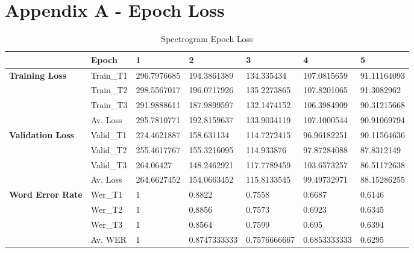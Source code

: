
\chapter{Appendix A - Epoch Loss} %

\label{AppendixA} %

\begin{table}[!ht]
    \centering
    \caption{Spectrogram Epoch Loss}
    \begin{adjustbox}{width=\textwidth,keepaspectratio}
    \begin{tabular}{|l|l|l|l|l|l|l|}
    \hline
        \textbf{} & \textbf{Epoch} & \textbf{1} & \textbf{2} & \textbf{3} & \textbf{4} & \textbf{5} \\ \hline
        \textbf{Training Loss} & Train\_T1 & 296.7976685 & 194.3861389 & 134.335434 & 107.0815659 & 91.11164093 \\ \hline
        \textbf{} & Train\_T2 & 298.5567017 & 196.0717926 & 135.2273865 & 107.8201065 & 91.3082962 \\ \hline
        \textbf{} & Train\_T3 & 291.9888611 & 187.9899597 & 132.1474152 & 106.3984909 & 90.31215668 \\ \hline
        \textbf{} & Av. Loss & 295.7810771 & 192.8159637 & 133.9034119 & 107.1000544 & 90.91069794 \\ \hline
        \textbf{Validation Loss} & Valid\_T1 & 274.4621887 & 158.631134 & 114.7272415 & 96.96182251 & 90.11564636 \\ \hline
        \textbf{} & Valid\_T2 & 255.4617767 & 155.3216095 & 114.933876 & 97.87284088 & 87.8312149 \\ \hline
        \textbf{} & Valid\_T3 & 264.06427 & 148.2462921 & 117.7789459 & 103.6573257 & 86.51172638 \\ \hline
        \textbf{} & Av. Loss & 264.6627452 & 154.0663452 & 115.8133545 & 99.49732971 & 88.15286255 \\ \hline
        \textbf{Word Error Rate} & Wer\_T1 & 1 & 0.8822 & 0.7558 & 0.6687 & 0.6146 \\ \hline
        \textbf{} & Wer\_T2 & 1 & 0.8856 & 0.7573 & 0.6923 & 0.6345 \\ \hline
        \textbf{} & Wer\_T3 & 1 & 0.8564 & 0.7599 & 0.695 & 0.6394 \\ \hline
        \textbf{} & Av. WER & 1 & 0.8747333333 & 0.7576666667 & 0.6853333333 & 0.6295 \\ \hline
    \end{tabular}
    \end{adjustbox}
    \label{spectro_epochloss}
\end{table}

